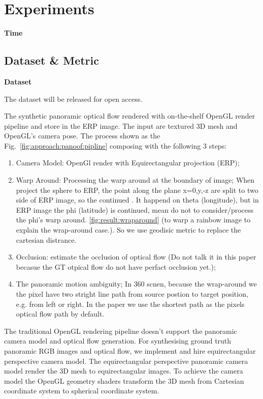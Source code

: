 \section{Experiments}\label{sec:exp}

\textbf{Time} 



\subsection{Dataset \& Metric}


\textbf{Dataset}

The dataset will be released for open access.


The synthetic panoramic optical flow rendered with on-the-shelf OpenGL render pipeline and store in the ERP image.
The input are textured 3D mesh and OpenGL's camera pose.
The process shown as the Fig.~\ref{fig:approach:panoof:pipline} composing with the following 3 steps:

\begin{enumerate}
	\item Camera Model: OpenGl render with Equirectangular projection (ERP);
	\item Warp Around: Processing the warp around at the boundary of image; When project the sphere to ERP, the point along the plane x=0,y,-z are split to two side of ERP image, so the continued . It happend on theta (longitude), but in ERP image the phi (latitude) is continued, mean do not to consider/process the phi's warp around. \ref{fig:result:wraparound} (to warp a rainbow image to explain the wrap-around case.). So we use geodisic metric to replace the cartesian distrance.
	\item Occlusion: estimate the occlusion of optical flow (Do not talk it in this paper becasue the GT otpical flow do not have perfact occlusion yet.);
	\item The panoramic motion ambiguity; In 360 scnen, because the wrap-around we the pixel have two stright line path from source postion to target position, e.g. from left or right. In the paper we use the shortest path as the pixels optical flow path by default.
\end{enumerate}

The traditional OpenGL rendering pipeline doesn't support the panoramic camera model and optical flow generation.
For synthesising ground truth panoramic RGB images and optical flow, we implement and hire equirectangular perspective camera model.
The equirectangular perspective panoramic camera model render the 3D mesh to equirectangular images.
To achieve the camera model the OpenGL geometry shaders transform the 3D mesh from Cartesian coordinate system to spherical coordinate system. 

